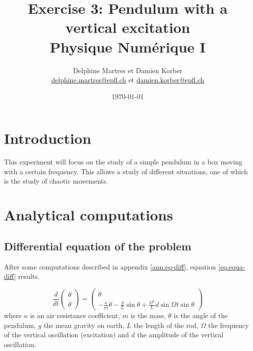 \documentclass[a4paper,12pt,twoside]{article}
\newcommand{\mail}[1]{{\href{mailto:#1}{#1}}}
\begin{document}
\title{Exercise 3: Pendulum with a vertical excitation\\{\small Physique Numérique I}}
\date{\today}
\author{Delphine Martres et Damien Korber\\{\small \mail{delphine.martres@epfl.ch} et \mail{damien.korber@epfl.ch}}}
\maketitle
\tableofcontents %
\newpage %
\baselineskip=16pt
\parindent=15pt
\parskip=5pt




\section{Introduction}
This experiment will focus on the study of a simple pendulum in a box moving with a certain frequency.
This allows a study of different situations, one of which is the study of chaotic movements.

\section{Analytical computations}
\subsection{Differential equation of the problem}
After some computations described in appendix \ref{ann:eq-diff}, equation \ref{eq:equa-diff} results.%

\begin{equation}
	\frac{d}{dt}
	\begin{pmatrix}
		\theta \\ \dot{\theta}
	\end{pmatrix}
	= \begin{pmatrix}
	\dot{\theta} \\
		-\frac{\kappa}{m}\dot{\theta} - \frac{g}{L}\sin\theta + \frac{\Omega^2}{L} d \sin{\Omega t} \sin\theta
	\end{pmatrix}
	\label{eq:equa-diff}
\end{equation}
where $\kappa$ is an air resistance coefficient, $m$ is the mass, $\theta$ is the angle of the pendulum, $g$ the mean gravity on earth, $L$ the length of the rod, $\Omega$ the frequency of the vertical oscillation (excitation) and $d$ the amplitude of the vertical oscillation.
\end{document}
